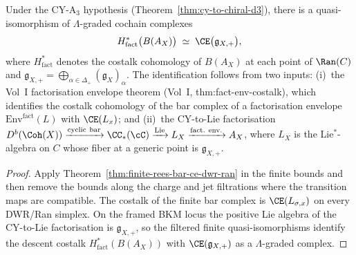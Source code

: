 \begin{proposition}
\label{prop:chiral-ce-comparison}
Under the CY-A$_3$ hypothesis \textup{(}Theorem~\ref{thm:cy-to-chiral-d3}\textup{)}, there is a quasi-isomorphism of $\Lambda$-graded cochain complexes
\[
 H^*_{\mathrm{fact}}\bigl(B(A_X)\bigr)
 \;\simeq\;
 \CE\bigl(\mathfrak{g}_{X,+}\bigr),
\]
where $H^*_{\mathrm{fact}}$ denotes the costalk cohomology of $B(A_X)$ at each point of $\Ran(C)$ and $\mathfrak{g}_{X,+} = \bigoplus_{\alpha \in \Delta_+} (\mathfrak{g}_X)_\alpha$. The identification follows from two inputs: \textup{(i)}~the Vol~I factorisation envelope theorem (Vol~I, thm:fact-env-costalk), which identifies the costalk cohomology of the bar complex of a factorisation envelope $\mathrm{Env}^{\mathrm{fact}}(L)$ with $\CE(L_x)$; and \textup{(ii)}~the CY-to-Lie factorisation $D^b(\Coh(X)) \xrightarrow{\mathrm{cyclic\ bar}} \CC_*(\cC) \xrightarrow{\mathrm{Lie}} L_X \xrightarrow{\mathrm{fact.\ env.}} A_X$, where $L_X$ is the Lie$^*$-algebra on $C$ whose fiber at a generic point is $\mathfrak{g}_{X,+}$.
\end{proposition}

\begin{proof}
Apply Theorem~\ref{thm:finite-rees-bar-ce-dwr-ran} in the finite
bounds and then remove the bounds along the charge and jet filtrations
where the transition maps are compatible.  The costalk of the finite
bar complex is $\CE(L_{\sigma,x})$ on every DWR/Ran simplex.  On the
framed BKM locus the positive Lie algebra of the CY-to-Lie
factorisation is $\mathfrak g_{X,+}$, so the filtered finite
quasi-isomorphisms identify the descent costalk
$H^*_{\mathrm{fact}}(B(A_X))$ with $\CE(\mathfrak g_{X,+})$ as a
$\Lambda$-graded complex.
\end{proof}

